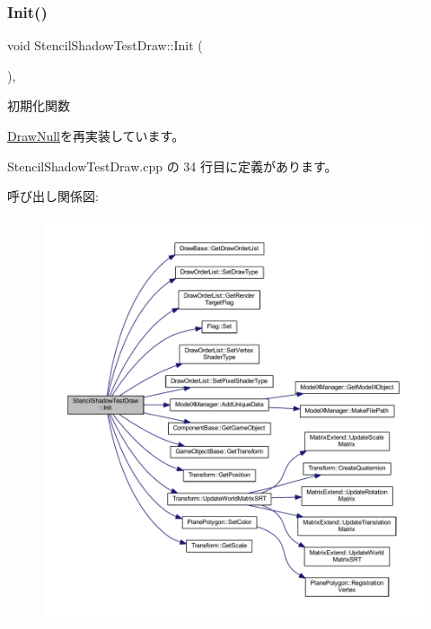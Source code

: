 \subsubsection{\texorpdfstring{Init()}{Init()}}
{\footnotesize\ttfamily void Stencil\+Shadow\+Test\+Draw\+::\+Init (\begin{DoxyParamCaption}{ }\end{DoxyParamCaption})\hspace{0.3cm}{\ttfamily [override]}, {\ttfamily [virtual]}}



初期化関数 



\mbox{\hyperlink{class_draw_null_acd7fef3ccea1da537ac9507ffbb6dd2e}{Draw\+Null}}を再実装しています。



 Stencil\+Shadow\+Test\+Draw.\+cpp の 34 行目に定義があります。

呼び出し関係図\+:\nopagebreak
\begin{figure}[H]
\begin{center}
\leavevmode
\includegraphics[width=350pt]{class_stencil_shadow_test_draw_a65be72e71cd12cacf315b0364c12c3e3_cgraph}
\end{center}
\end{figure}
\mbox{\label{class_stencil_shadow_test_draw_a68917115d3f151ed91ce297924ee5bbb}} 
